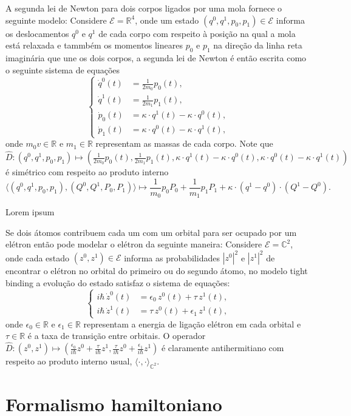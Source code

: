 \begin{exemplo}
   A segunda lei de Newton para dois corpos ligados por uma mola
   fornece o seguinte modelo:
   Considere $\mathcal{E} = \mathbb{R}^4$,
   onde um estado $(q^0, q^1, p_0, p_1)\in\mathcal{E}$
   informa os deslocamentos $q^0$ e $q^1$ de cada corpo com respeito
   à posição na qual a mola está relaxada e tammbém os momentos lineares
   $p_0$ e $p_1$ na direção da linha reta imaginária que une os dois corpos,
   a segunda lei de Newton é então escrita como o seguinte sistema de equações
   $$
      \left\{\begin{aligned}
         \dot q^0(t) &= \frac{1}{2 m_0} p_0(t), \\
         \dot q^1(t) &= \frac{1}{2 m_1} p_1(t), \\
         \dot p_0(t) &= \kappa \cdot q^1(t) - \kappa \cdot q^0(t), \\
         \dot p_1(t) &= \kappa \cdot q^0(t) - \kappa \cdot q^1(t),
      \end{aligned}\right.
   $$
   onde $m_0v\in\mathbb{R}$ e $m_1\in\mathbb{R}$ representam as massas
   de cada corpo.
   Note que
   $\hat{D}:(q^0, q^1, p_0, p_1)\mapsto\left(
      \frac{1}{2 m_0} p_0(t),
      \frac{1}{2 m_1} p_1(t),
      \kappa \cdot q^1(t) - \kappa \cdot q^0(t),
      \kappa \cdot q^0(t) - \kappa \cdot q^1(t)
   \right)$
   é simétrico com respeito ao produto interno
   $$
      \langle(q^0, q^1, p_0, p_1), (Q^0, Q^1, P_0, P_1)\rangle\mapsto
      \frac{1}{m_0} p_0 P_0 + \frac{1}{m_1} p_1 P_1 +
      \kappa \cdot (q^1 - q^0) \cdot (Q^1 - Q^0).
   $$
\end{exemplo}

Lorem ipsum

\begin{exemplo}
   Se dois átomos contribuem cada um com um orbital para ser ocupado por
   um elétron então pode modelar o elétron da seguinte maneira:
   Considere $\mathcal{E} = \mathbb{C}^2$, onde cada estado
   $(z^0, z^1)\in\mathcal{E}$ informa as probabilidades
   $|z^0|^2$ e $|z^1|^2$ de encontrar o elétron no orbital
   do primeiro ou do segundo átomo,
   no modelo tight binding a evolução do estado satisfaz o sistema de equações:
   $$
      \left\{\begin{aligned}
         i \hbar \, \dot z^0(t) &= \epsilon_0 \, z^0(t) + \tau \, z^1(t), \\
         i \hbar \, \dot z^1(t) &= \tau \, z^0(t) + \epsilon_1 \, z^1(t),
      \end{aligned}\right.
   $$
   onde $\epsilon_0\in\mathbb{R}$ e $\epsilon_1\in\mathbb{R}$
   representam a energia de ligação elétron em cada orbital e
   $\tau\in\mathbb{R}$ é a taxa de transição entre orbitais.
   O operador $\hat{D}:(z^0, z^1)\mapsto\left(
      \frac{\epsilon_0}{i \hbar} z^0 + \frac{\tau}{i \hbar} z^1,
      \frac{\tau}{i \hbar} z^0 + \frac{\epsilon_1}{i \hbar} z^1
   \right)$ é claramente antihermitiano com respeito ao produto interno usual,
   $\langle\cdot,\cdot\rangle_{\mathbb{C}^2}$.
\end{exemplo}

\section{Formalismo hamiltoniano}

